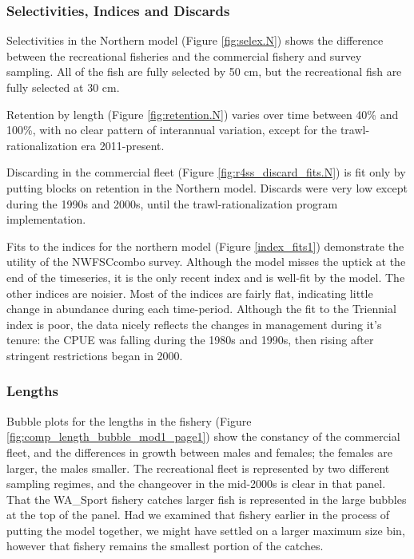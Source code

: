 \documentclass[12pt,]{article}
\begin{document}
\subsubsection{Selectivities, Indices and
Discards}\label{selectivities-indices-and-discards}

Selectivities in the Northern model (Figure \ref{fig:selex.N}) shows the
difference between the recreational fisheries and the commercial fishery
and survey sampling. All of the fish are fully selected by 50 cm, but
the recreational fish are fully selected at 30 cm.

Retention by length (Figure \ref{fig:retention.N}) varies over time
between 40\% and 100\%, with no clear pattern of interannual variation,
except for the trawl-rationalization era 2011-present.

Discarding in the commercial fleet (Figure
\ref{fig:r4ss_discard_fits.N}) is fit only by putting blocks on
retention in the Northern model. Discards were very low except during
the 1990s and 2000s, until the trawl-rationalization program
implementation.

Fits to the indices for the northern model (Figure \ref{index_fits1})
demonstrate the utility of the NWFSCcombo survey. Although the model
misses the uptick at the end of the timeseries, it is the only recent
index and is well-fit by the model. The other indices are noisier. Most
of the indices are fairly flat, indicating little change in abundance
during each time-period. Although the fit to the Triennial index is
poor, the data nicely reflects the changes in management during it's
tenure: the CPUE was falling during the 1980s and 1990s, then rising
after stringent restrictions began in 2000.

\subsubsection{Lengths}\label{lengths}

Bubble plots for the lengths in the fishery (Figure
\ref{fig:comp_length_bubble_mod1_page1}) show the constancy of the
commercial fleet, and the differences in growth between males and
females; the females are larger, the males smaller. The recreational
fleet is represented by two different sampling regimes, and the
changeover in the mid-2000s is clear in that panel. That the WA\_Sport
fishery catches larger fish is represented in the large bubbles at the
top of the panel. Had we examined that fishery earlier in the process of
putting the model together, we might have settled on a larger maximum
size bin, however that fishery remains the smallest portion of the
catches.
\end{document}
